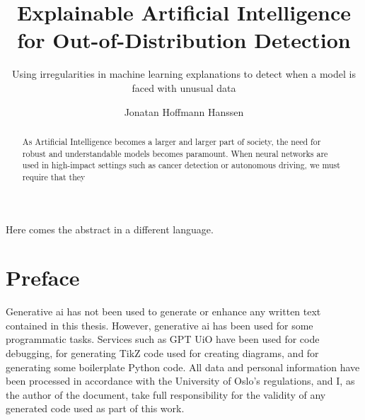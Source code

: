 \documentclass[UKenglish]{uiomasterthesis} %
\title{Explainable Artificial Intelligence for Out-of-Distribution Detection}
\subtitle{Using irregularities in machine learning explanations to detect when a model is faced with unusual data}
\author{Jonatan Hoffmann Hanssen}
\theoremstyle{definition}
\begin{document}
\uiomasterfp[dept={Department of Informatics},
program={Robotics and Intelligent Systems},
supervisors={Hugo Lewi Hammer \and Kyrre Harald Glette}, image={/home/jona/.config/zsh/cat.jpg},
long]

\frontmatter{}
\begin{abstract}
As Artificial Intelligence becomes a larger and larger part of society, the need for robust and understandable models becomes paramount. When neural networks are used in high-impact settings such as cancer detection or autonomous driving, we must require that they 
\end{abstract}

\begin{xabstract}[Sammendrag]
Here comes the abstract in a different language.
\end{xabstract}

\chapter*{Preface}

Generative \ac{ai} has not been used to generate or enhance any written text contained in this thesis. However, generative \ac{ai} has been used for some programmatic tasks. Services such as GPT UiO have been used for code debugging, for generating TikZ code used for creating diagrams, and for generating some boilerplate Python code. All data and personal information have been processed in accordance with the University of Oslo's regulations, and I, as the author of the document, take full responsibility for the validity of any generated code used as part of this work.



\tableofcontents{}
\listoffigures{}
\listoftables{}
\end{document}
